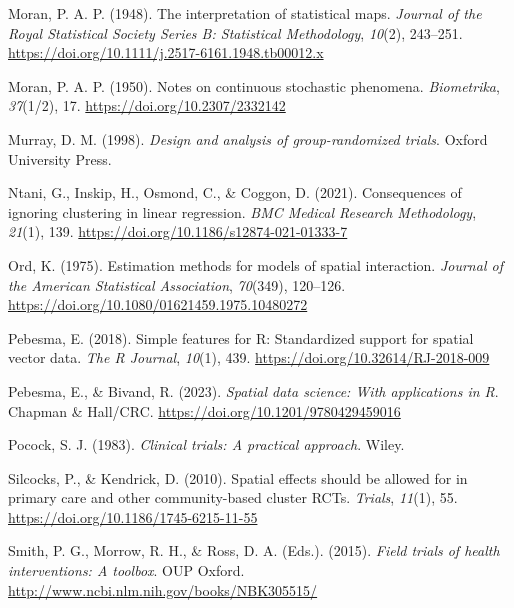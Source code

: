 \documentclass[
  12pt,
  prelim]{bios-prelim}
\newlength{\cslhangindent}
\newenvironment{CSLReferences}[2] %
 {\begin{list}{}{%
  \setlength{\itemindent}{0pt}
  \setlength{\leftmargin}{0pt}
  \setlength{\parsep}{0pt}
  \ifodd #1
   \setlength{\leftmargin}{\cslhangindent}
   \setlength{\itemindent}{-1\cslhangindent}
  \fi
  \setlength{\itemsep}{#2\baselineskip}}}
 {\end{list}}
\begin{document}
\begin{CSLReferences}{1}{0}
Moran, P. A. P. (1948). The interpretation of statistical maps.
\emph{Journal of the Royal Statistical Society Series B: Statistical
Methodology}, \emph{10}(2), 243--251.
\url{https://doi.org/10.1111/j.2517-6161.1948.tb00012.x}

Moran, P. A. P. (1950). Notes on continuous stochastic phenomena.
\emph{Biometrika}, \emph{37}(1/2), 17.
\url{https://doi.org/10.2307/2332142}

Murray, D. M. (1998). \emph{Design and analysis of group-randomized
trials}. Oxford University Press.

Ntani, G., Inskip, H., Osmond, C., \& Coggon, D. (2021). Consequences of
ignoring clustering in linear regression. \emph{BMC Medical Research
Methodology}, \emph{21}(1), 139.
\url{https://doi.org/10.1186/s12874-021-01333-7}

Ord, K. (1975). Estimation methods for models of spatial interaction.
\emph{Journal of the American Statistical Association}, \emph{70}(349),
120--126. \url{https://doi.org/10.1080/01621459.1975.10480272}

Pebesma, E. (2018). Simple features for {R}: Standardized support for
spatial vector data. \emph{The R Journal}, \emph{10}(1), 439.
\url{https://doi.org/10.32614/RJ-2018-009}

Pebesma, E., \& Bivand, R. (2023). \emph{Spatial data science: With
applications in {R}}. Chapman \& Hall/CRC.
\url{https://doi.org/10.1201/9780429459016}

Pocock, S. J. (1983). \emph{Clinical trials: A practical approach}.
Wiley.

Silcocks, P., \& Kendrick, D. (2010). Spatial effects should be allowed
for in primary care and other community-based cluster {RCTs}.
\emph{Trials}, \emph{11}(1), 55.
\url{https://doi.org/10.1186/1745-6215-11-55}

Smith, P. G., Morrow, R. H., \& Ross, D. A. (Eds.). (2015). \emph{Field
trials of health interventions: A toolbox}. OUP Oxford.
\url{http://www.ncbi.nlm.nih.gov/books/NBK305515/}


\end{CSLReferences}
\end{document}
